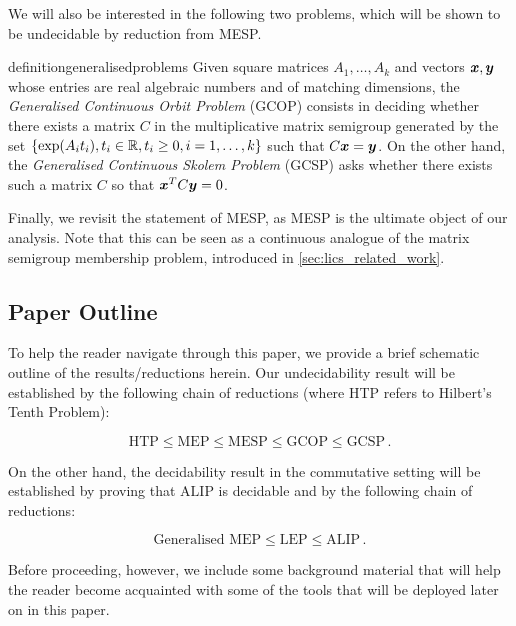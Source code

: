 We will also be interested in the following two problems, which will be shown to be undecidable by reduction from MESP\@.

\begin{restatable}{definition}{generalisedproblems}
\label{def:generalised-problems}
Given square matrices $A_{1}, \ldots, A_{k}$ and vectors $\boldsymbol{x}, \boldsymbol{y}$ whose entries are real algebraic numbers and of matching dimensions, the \emph{Generalised Continuous Orbit Problem} (GCOP) consists in deciding whether there exists a matrix $C$ in the multiplicative matrix semigroup generated by the set $\lbrace \exp(A_{i} t_{i}), t_{i} \in \mathbb{R}, t_{i} \geq 0, i = 1, \ldots, k \rbrace$ such that $C\boldsymbol{x} = \boldsymbol{y}$. On the other hand, the \emph{Generalised Continuous Skolem Problem} (GCSP) asks whether there exists such a matrix $C$ so that $\boldsymbol{x}^{T} C \boldsymbol{y} = 0$.
\end{restatable}

Finally, we revisit the statement of MESP, as MESP is the ultimate object of our analysis.
Note that this can be seen as a continuous analogue of the matrix semigroup membership problem, introduced in \cref{sec:lics_related_work}.

\MESP*

\subsection{Paper Outline}
\label{sec:lics_outline}

To help the reader navigate through this paper, we provide a brief schematic outline of the results/reductions herein. Our undecidability result will be established by the following chain of reductions (where HTP refers to Hilbert's Tenth Problem):

\begin{equation*}
\mbox{HTP} \leq \mbox{MEP} \leq \mbox{MESP} \leq \mbox{GCOP} \leq \mbox{GCSP} \, .
\end{equation*}

On the other hand, the decidability result in the commutative setting will be established by proving that $\mbox{ALIP}$ is decidable and by the following chain of reductions:

\begin{equation*}
\mbox{Generalised MEP} \leq \mbox{LEP} \leq \mbox{ALIP} \, .
\end{equation*}

Before proceeding, however, we include some background material that will help the reader become acquainted with some of the tools that will be deployed later on in this paper.

